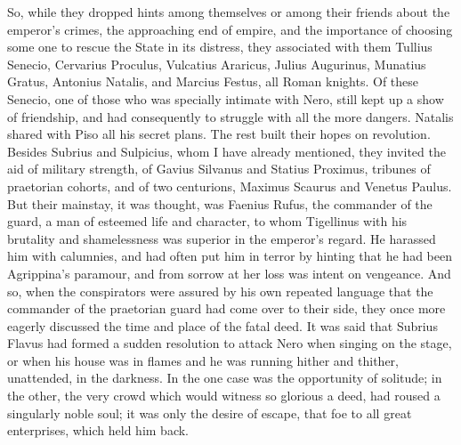 So, while they dropped hints among themselves or among their friends about the emperor's crimes, the approaching end of empire, and the importance of choosing some one to rescue the State in its distress, they associated with them Tullius Senecio, Cervarius Proculus, Vulcatius Araricus, Julius Augurinus, Munatius Gratus, Antonius Natalis, and Marcius Festus, all Roman knights. Of these Senecio, one of those who was specially intimate with Nero, still kept up a show of friendship, and had consequently to struggle with all the more dangers. Natalis shared with Piso all his secret plans. The rest built their hopes on revolution. Besides Subrius and Sulpicius, whom I have already mentioned, they invited the aid of military strength, of Gavius Silvanus and Statius Proximus, tribunes of praetorian cohorts, and of two centurions, Maximus Scaurus and Venetus Paulus. But their mainstay, it was thought, was Faenius Rufus, the commander of the guard, a man of esteemed life and character, to whom Tigellinus with his brutality and shamelessness was superior in the emperor's regard. He harassed him with calumnies, and had often put him in terror by hinting that he had been Agrippina's paramour, and from sorrow at her loss was intent on vengeance. And so, when the conspirators were assured by his own repeated language that the commander of the praetorian guard had come over to their side, they once more eagerly discussed the time and place of the fatal deed. It was said that Subrius Flavus had formed a sudden resolution to attack Nero when singing on the stage, or when his house was in flames and he was running hither and thither, unattended, in the darkness. In the one case was the opportunity of solitude; in the other, the very crowd which would witness so glorious a deed, had roused a singularly noble soul; it was only the desire of escape, that foe to all great enterprises, which held him back.


